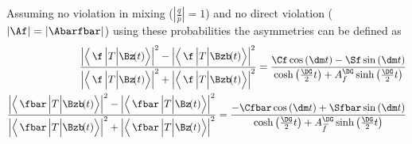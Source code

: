 Assuming no \CP violation in mixing ($\left|\frac{q}{p}\right|=1$) and no direct \CP violation ($\left|\Af\right|=\left|\Abarfbar\right|$)
using these probabilities the \CP asymmetries can be defined as
\begin{align}
\frac{\left|\left<\,\f\,\Big|T\Big|\Bz\!(t)\right>\right|^2 - \left|\left<\,\f\,\Big|T\Big|\Bzb\!(t)\right>\right|^2}{\left|\left<\,\f\,\Big|T\Big|\Bz\!(t)\right>\right|^2 + \left|\left<\,\f\,\Big|T\Big|\Bzb\!(t)\right>\right|^2}
= \frac{\Cf\cos\left(\dm t\right) - \Sf\sin\left(\dm t\right)}{\cosh\left(\frac{\DG}{2}t\right) + A_f^{\DG}\sinh\left(\frac{\DG}{2}t\right)}\\
\frac{\left|\left<\,\fbar\,\Big|T\Big|\Bzb\!(t)\right>\right|^2 - \left|\left<\,\fbar\,\Big|T\Big|\Bz\!(t)\right>\right|^2}{\left|\left<\,\fbar\,\Big|T\Big|\Bzb\!(t)\right>\right|^2 + \left|\left<\,\fbar\,\Big|T\Big|\Bz\!(t)\right>\right|^2} = \frac{-\Cfbar\cos\left(\dm t\right) + \Sfbar\sin\left(\dm t\right)}{\cosh\left(\frac{\DG}{2}t\right) + A_{\kern 1.5pt\overline{\kern -1.5pt f\kern 1.5pt}}^{\DG}\sinh\left(\frac{\DG}{2}t\right)}
\end{align}

